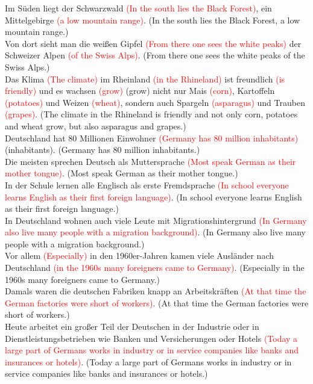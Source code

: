\documentclass{article}
\begin{document}
Im Süden liegt der Schwarzwald \textcolor{red}{(In the south lies the Black Forest)}, ein Mittelgebirge \textcolor{red}{(a low mountain range)}. (In the south lies the Black Forest, a low mountain range.)\\
Von dort sieht man die weißen Gipfel \textcolor{red}{(From there one sees the white peaks)} der Schweizer Alpen \textcolor{red}{(of the Swiss Alps)}. (From there one sees the white peaks of the Swiss Alps.) \\
Das Klima \textcolor{red}{(The climate)} im Rheinland \textcolor{red}{(in the Rhineland)} ist freundlich \textcolor{red}{(is friendly)} und es wachsen \textcolor{red}{(grow)} (grow) nicht nur Mais \textcolor{red}{(corn)}, Kartoffeln \textcolor{red}{(potatoes)} und Weizen \textcolor{red}{(wheat)}, sondern auch Spargeln \textcolor{red}{(asparagus)} und Trauben \textcolor{red}{(grapes)}. (The climate in the Rhineland is friendly and not only corn, potatoes and wheat grow, but also asparagus and grapes.)\\
Deutschland hat 80 Millionen Einwohner \textcolor{red}{(Germany has 80 million inhabitants)} (inhabitants). (Germany has 80 million inhabitants.)\\
Die meisten sprechen Deutsch als Muttersprache \textcolor{red}{(Most speak German as their mother tongue)}. (Most speak German as their mother tongue.)\\
In der Schule lernen alle Englisch als erste Fremdsprache \textcolor{red}{(In school everyone learns English as their first foreign language)}. (In school everyone learns English as their first foreign language.) \\
In Deutschland wohnen auch viele Leute mit Migrationshintergrund \textcolor{red}{(In Germany also live many people with a migration background)}. (In Germany also live many people with a migration background.) \\
Vor allem \textcolor{red}{(Especially)} in den 1960er-Jahren kamen viele Ausländer nach Deutschland \textcolor{red}{(in the 1960s many foreigners came to Germany)}. (Especially in the 1960s many foreigners came to Germany.)\\
Damals waren die deutschen Fabriken knapp an Arbeitskräften \textcolor{red}{(At that time the German factories were short of workers)}. (At that time the German factories were short of workers.)\\
Heute arbeitet ein großer Teil der Deutschen in der Industrie oder in Dienstleistungsbetrieben wie Banken und Versicherungen oder Hotels \textcolor{red}{(Today a large part of Germans works in industry or in service companies like banks and insurances or hotels)}. (Today a large part of Germans works in industry or in service companies like banks and insurances or hotels.)
\end{document}
